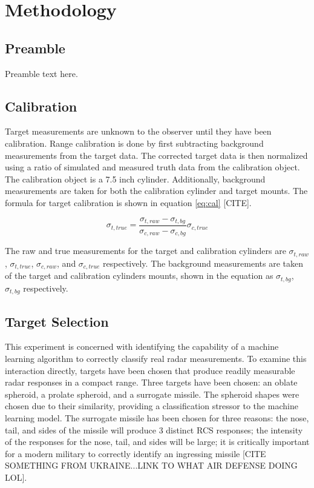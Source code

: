 \chapter{Methodology}
\label{ch:methodology}
\glsresetall
\section{Preamble}

Preamble text here.

\section{Calibration}

Target measurements are unknown to the observer until they have been calibration. Range calibration is done by first subtracting background measurements from the target data. The corrected target data is then normalized using a ratio of simulated and measured truth data from the calibration object. The calibration object is a 7.5 inch cylinder. Additionally, background measurements are taken for both the calibration cylinder and target mounts. The formula for target calibration is shown in equation \ref{eq:cal} [CITE].

\begin{equation}\label{eq:cal}
    \sigma_{t, true} = \frac{\sigma_{t, raw} - \sigma_{t, bg}}{\sigma_{c, raw} - \sigma_{c, bg}}\sigma_{c, true}
\end{equation}

The raw and true measurements for the target and calibration cylinders are $\sigma_{t, raw}$, $\sigma_{t, true}$, $\sigma_{c, raw}$, and $\sigma_{c, true}$ respectively. The background measurements are taken of the target and calibration cylinders mounts, shown in the equation as $\sigma_{t, bg}$, $\sigma_{t, bg}$ respectively.

\section{Target Selection}
\label{sec:anothersectionRefName}

This experiment is concerned with identifying the capability of a machine learning algorithm to correctly classify real radar measurements. To examine this interaction directly, targets have been chosen that produce readily measurable radar responses in a compact range. Three targets have been chosen:  an oblate spheroid, a prolate spheroid, and a surrogate missile. The spheroid shapes were chosen due to their similarity, providing a classification stressor to the machine learning model. The surrogate missile has been chosen for three reasons:  the nose, tail, and sides of the missile will produce 3 distinct RCS responses; the intensity of the responses for the nose, tail, and sides will be large; it is critically important for a modern military to correctly identify an ingressing missile [CITE SOMETHING FROM UKRAINE...LINK TO WHAT AIR DEFENSE DOING LOL].

